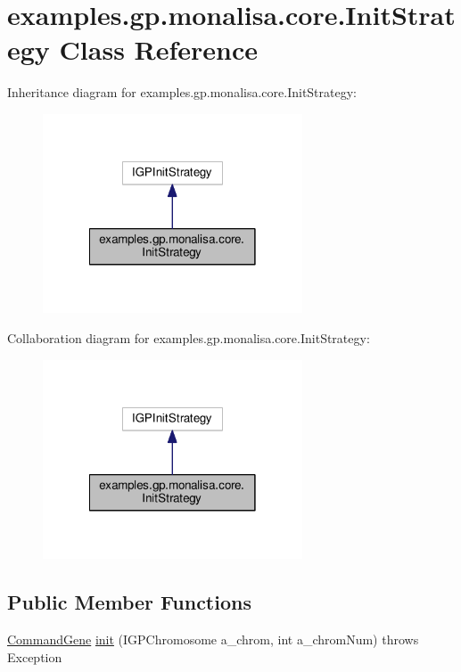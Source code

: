 \hypertarget{classexamples_1_1gp_1_1monalisa_1_1core_1_1_init_strategy}{\section{examples.\-gp.\-monalisa.\-core.\-Init\-Strategy Class Reference}
\label{classexamples_1_1gp_1_1monalisa_1_1core_1_1_init_strategy}
}


Inheritance diagram for examples.\-gp.\-monalisa.\-core.\-Init\-Strategy\-:
\nopagebreak
\begin{figure}[H]
\begin{center}
\leavevmode
\includegraphics[width=218pt]{classexamples_1_1gp_1_1monalisa_1_1core_1_1_init_strategy__inherit__graph}
\end{center}
\end{figure}


Collaboration diagram for examples.\-gp.\-monalisa.\-core.\-Init\-Strategy\-:
\nopagebreak
\begin{figure}[H]
\begin{center}
\leavevmode
\includegraphics[width=218pt]{classexamples_1_1gp_1_1monalisa_1_1core_1_1_init_strategy__coll__graph}
\end{center}
\end{figure}
\subsection*{Public Member Functions}
\begin{DoxyCompactItemize}
\item 
\hyperlink{classorg_1_1jgap_1_1gp_1_1_command_gene}{Command\-Gene} \hyperlink{classexamples_1_1gp_1_1monalisa_1_1core_1_1_init_strategy_ac5dbac4da3ad235781439b138462061e}{init} (I\-G\-P\-Chromosome a\-\_\-chrom, int a\-\_\-chrom\-Num)  throws Exception 
\end{DoxyCompactItemize}
